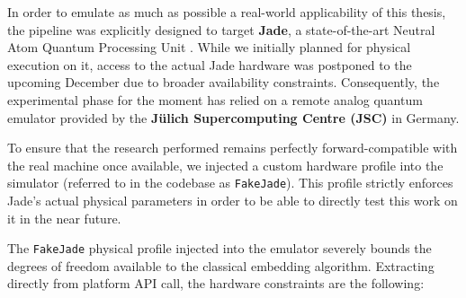 In order to emulate as much as possible a real-world applicability of this thesis, the pipeline was explicitly designed to target \textbf{Jade}, a state-of-the-art Neutral Atom Quantum Processing Unit \cite{pasqal2026italy}. While we initially planned for physical execution on it, access to the actual Jade hardware was postponed to the upcoming December due to broader availability constraints. Consequently, the experimental phase for the moment has relied on a remote analog quantum emulator provided by the \textbf{Jülich Supercomputing Centre (JSC)} in Germany. 

To ensure that the research performed remains perfectly forward-compatible with the real machine once available, we injected a custom hardware profile into the simulator (referred to in the codebase \cite{orsucci_qubo_ga_quantum} as \texttt{FakeJade}). This profile strictly enforces Jade's actual physical parameters in order to be able to directly test this work on it in the near future.


The \texttt{FakeJade} physical profile injected into the emulator severely bounds the degrees of freedom available to the classical embedding algorithm. Extracting directly from platform API call, the hardware constraints are the following:

